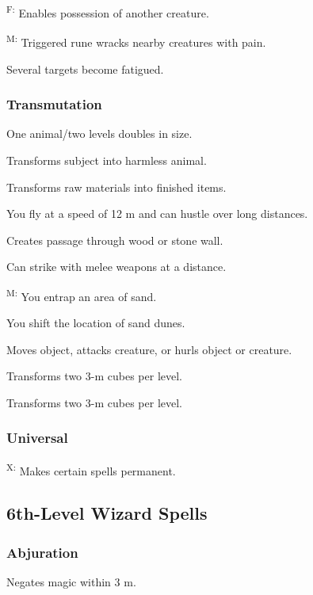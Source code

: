 	\textsuperscript{F:} Enables possession of another creature.

	\textsuperscript{M:} Triggered rune wracks nearby creatures with pain.

	 Several targets become fatigued.

\subsubsection{Transmutation}
	 One animal/two levels doubles in size.
	
	 Transforms subject into harmless animal.
	
	 Transforms raw materials into finished items.
	
	 You fly at a speed of 12 m and can hustle over long distances.
	
	 Creates passage through wood or stone wall.
	
	 Can strike with melee weapons at a distance. %
	
	\textsuperscript{M:} You entrap an area of sand. %
	
	 You shift the location of sand dunes. %
	
	 Moves object, attacks creature, or hurls object or creature.
	
	 Transforms two 3-m cubes per level.
	
	 Transforms two 3-m cubes per level.

\subsubsection{Universal}
	\textsuperscript{X:} Makes certain spells permanent.



\subsection{6th-Level Wizard Spells}

\subsubsection{Abjuration}
	 Negates magic within 3 m.


